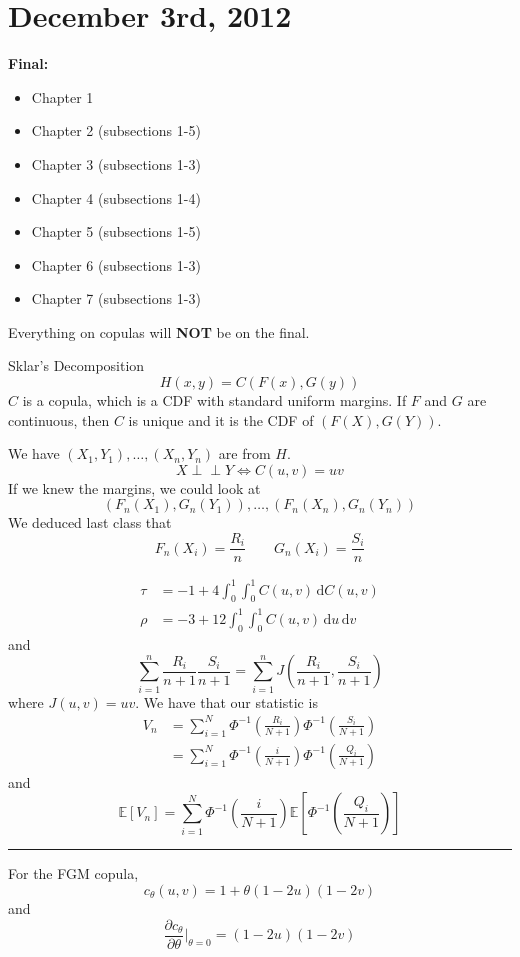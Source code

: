 \documentclass[a4paper,12pt]{amsart}
\newcommand{\sumin}{\sum_{i=1}^n}
\newcommand{\sumiN}{\sum_{i=1}^N}
\newcommand{\du}{\,\mathrm{d}u}
\newcommand{\dv}{\,\mathrm{d}v}
\newcommand{\E}[1]{\mathbb{E}\left[#1\right]}
\newcommand{\indep}{\perp \!\!\! \perp}
\begin{document}
\section{December 3rd, 2012}
\noindent
\textbf{Final:}
\begin{itemize}
\item Chapter 1
\item Chapter 2 (subsections 1-5)
\item Chapter 3 (subsections 1-3)
\item Chapter 4 (subsections 1-4)
\item Chapter 5 (subsections 1-5)
\item Chapter 6 (subsections 1-3)
\item Chapter 7 (subsections 1-3)
\end{itemize}
Everything on copulas will \textbf{NOT} be on the final.

\bigskip

Sklar's Decomposition
\[H(x,y) = C(F(x),G(y))\]
$C$ is a copula, which is a CDF with standard uniform margins. If $F$ and $G$ are continuous, then $C$ is unique and it is the CDF of $(F(X),G(Y))$.

We have $(X_1,Y_1),\ldots,(X_n,Y_n)$ are from $H$.
\[X \indep Y \Leftrightarrow C(u,v) = uv\]
If we knew the margins, we could look at 
\[(F_n(X_1),G_n(Y_1)),\ldots, (F_n(X_n),G_n(Y_n))\]
We deduced last class that
\[F_n(X_i) = \frac{R_i}{n} \qquad G_n(X_i) = \frac{S_i}{n}\]

\begin{align*}
\tau &= -1 + 4 \int_0^1 \int_0^1 \! C(u,v) \, \mathrm{d}C(u,v)\\
\rho &= -3 + 12 \int_0^1 \int_0^1 \! C(u,v) \du \dv
\end{align*}
and
\[\sumin \frac{R_i}{n+1}\frac{S_i}{n+1} = \sumin J\left(\frac{R_i}{n+1},\frac{S_i}{n+1}\right)\]
where $J(u,v) = uv$. We have that our statistic is 
\begin{align*}
V_n &= \sumiN \Phi^{-1}\left(\frac{R_i}{N+1}\right) \Phi^{-1} \left(\frac{S_i}{N+1}\right)\\
&= \sumiN \Phi^{-1}\left(\frac{i}{N+1}\right)\Phi^{-1}\left(\frac{Q_i}{N+1}\right)
\end{align*}
and
\[\E{V_n} = \sumiN \Phi^{-1}\left(\frac{i}{N+1}\right)\E{\Phi^{-1}\left(\frac{Q_i}{N+1}\right)}\]

\bigskip
\hrule
\bigskip

For the FGM copula, 
\[c_\theta(u,v) = 1 + \theta (1 - 2u)(1 - 2v)\]
and
\[\frac{\partial c_\theta}{\partial \theta}\bigg|_{\theta =0} = (1-2u)(1-2v)\]
\end{document}
